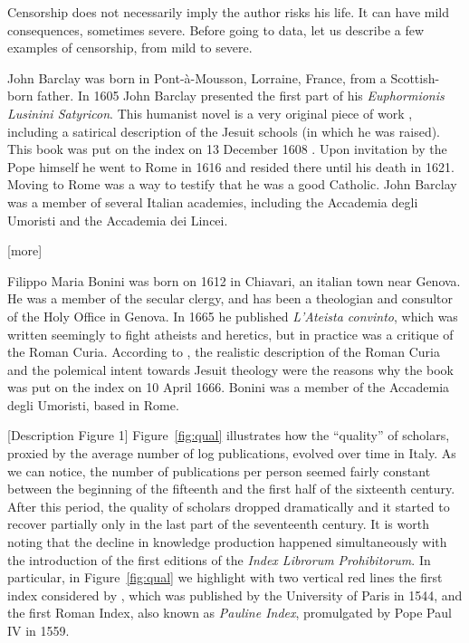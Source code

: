 \documentclass[12pt]{article}
\begin{document}
Censorship does not necessarily imply the author risks his life. It can have mild consequences, sometimes severe. Before going to data, let us describe a few examples of censorship, from mild to severe.

John Barclay was born in Pont-à-Mousson, Lorraine, France, from a Scottish-born father. In 1605 John Barclay presented the first part of his {\em Euphormionis Lusinini Satyricon}. This humanist novel is a very original piece of work \cite{correard17}, including a  satirical  description of the Jesuit schools (in which he was raised). This book was put on the index on 13 December 1608 . Upon invitation by the Pope himself he went to Rome in 1616 and resided there until his death in 1621. Moving to Rome was a way to testify that he was a good Catholic. John Barclay was a member of several Italian academies, including the Accademia degli Umoristi and  the Accademia dei Lincei.

[more]

Filippo Maria Bonini was born on 1612 in Chiavari, an italian town near Genova. He was a member of the secular clergy, and has been a theologian and consultor of the Holy Office in Genova. In 1665 he published {\em L'Ateista convinto}, which was written seemingly to fight atheists and heretics, but in practice was a critique of the Roman Curia. According to , the realistic description of the Roman Curia and the polemical intent towards Jesuit theology were the reasons why the book was put on the index on 10 April 1666. Bonini was a member of the Accademia degli Umoristi, based in Rome.

[Description Figure 1]
Figure~\ref{fig:qual} illustrates how the ``quality'' of scholars, proxied by the average number of log publications, evolved over time in Italy. As we can notice, the number of publications per person seemed fairly constant between the beginning of the fifteenth and the first half of the sixteenth century. After this period, the quality of scholars dropped dramatically and it started to recover partially only in the last part of the seventeenth century. It is worth noting that the decline in knowledge production happened simultaneously with the introduction of the first editions of the {\em Index Librorum Prohibitorum}. In particular, in Figure~\ref{fig:qual} we highlight with two vertical red lines the first index considered by , which was published by the University of Paris in 1544, and the first Roman Index, also known as {\em Pauline Index}, promulgated by Pope Paul IV in 1559.
\end{document}
